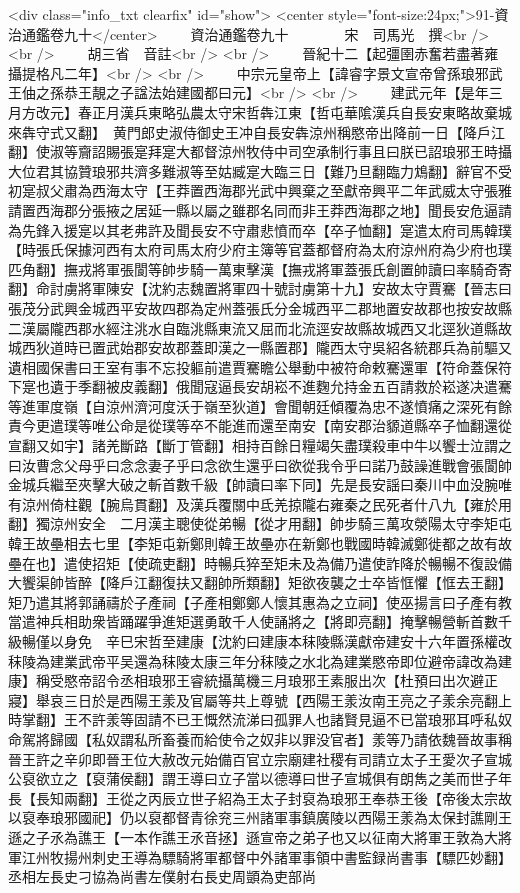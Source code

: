 <div class="info_txt clearfix" id="show">
<center style="font-size:24px;">91-資治通鑑卷九十</center>
  　　資治通鑑卷九十　　　　宋　司馬光　撰<br />
<br />
　　胡三省　音註<br />
<br />
　　晉紀十二【起彊圉赤奮若盡著雍攝提格凡二年】<br />
<br />
　　中宗元皇帝上【諱睿字景文宣帝曾孫琅邪武王伷之孫恭王靚之子諡法始建國都曰元】<br />
<br />
　　建武元年【是年三月方改元】春正月漢兵東略弘農太守宋哲犇江東【哲屯華隂漢兵自長安東略故棄城來犇守式又翻】　黄門郎史淑侍御史王冲自長安犇涼州稱愍帝出降前一日【降戶江翻】使淑等齎詔賜張寔拜寔大都督涼州牧侍中司空承制行事且曰朕已詔琅邪王時攝大位君其協贊琅邪共濟多難淑等至姑臧寔大臨三日【難乃旦翻臨力鴆翻】辭官不受初寔叔父肅為西海太守【王莽置西海郡光武中興棄之至獻帝興平二年武威太守張雅請置西海郡分張掖之居延一縣以屬之雖郡名同而非王莽西海郡之地】聞長安危逼請為先鋒入援寔以其老弗許及聞長安不守肅悲憤而卒【卒子恤翻】寔遣太府司馬韓璞【時張氏保據河西有太府司馬太府少府主簿等官蓋都督府為太府涼州府為少府也璞匹角翻】撫戎將軍張閬等帥步騎一萬東擊漢【撫戎將軍蓋張氏創置帥讀曰率騎奇寄翻】命討虜將軍陳安【沈約志魏置將軍四十號討虜第十九】安故太守賈騫【晉志曰張茂分武興金城西平安故四郡為定州蓋張氏分金城西平二郡地置安故郡也按安故縣二漢屬隴西郡水經注洮水自臨洮縣東流又屈而北流逕安故縣故城西又北逕狄道縣故城西狄道時已置武始郡安故郡蓋即漢之一縣置郡】隴西太守吳紹各統郡兵為前驅又遺相國保書曰王室有事不忘投軀前遣賈騫瞻公舉動中被符命敕騫還軍【符命蓋保符下寔也遺于季翻被皮義翻】俄聞寇逼長安胡崧不進麴允持金五百請救於崧遂决遣騫等進軍度嶺【自涼州濟河度沃于嶺至狄道】會聞朝廷傾覆為忠不遂憤痛之深死有餘責今更遣璞等唯公命是從璞等卒不能進而還至南安【南安郡治䝠道縣卒子恤翻還從宣翻又如宇】諸羌斷路【斷丁管翻】相持百餘日糧竭矢盡璞殺車中牛以饗士泣謂之曰汝曹念父母乎曰念念妻子乎曰念欲生還乎曰欲從我令乎曰諾乃鼓譟進戰會張閬帥金城兵繼至夾擊大破之斬首數千級【帥讀曰率下同】先是長安謡曰秦川中血没腕唯有涼州倚柱觀【腕烏貫翻】及漢兵覆關中氐羌掠隴右雍秦之民死者什八九【雍於用翻】獨涼州安全　二月漢主聰使從弟暢【從才用翻】帥步騎三萬攻滎陽太守李矩屯韓王故壘相去七里【李矩屯新鄭則韓王故壘亦在新鄭也戰國時韓滅鄭徙都之故有故壘在也】遣使招矩【使疏吏翻】時暢兵猝至矩未及為備乃遣使詐降於暢暢不復設備大饗渠帥皆醉【降戶江翻復扶又翻帥所類翻】矩欲夜襲之士卒皆恇懼【恇去王翻】矩乃遣其將郭誦禱於子產祠【子產相鄭鄭人懷其惠為之立祠】使巫揚言曰子產有教當遣神兵相助衆皆踊躍爭進矩選勇敢千人使誦將之【將即亮翻】掩擊暢營斬首數千級暢僅以身免　辛巳宋哲至建康【沈約曰建康本秣陵縣漢獻帝建安十六年置孫權改秣陵為建業武帝平吴還為秣陵太康三年分秣陵之水北為建業愍帝即位避帝諱改為建康】稱受愍帝詔令丞相琅邪王睿統攝萬機三月琅邪王素服出次【杜預曰出次避正寢】舉哀三日於是西陽王羕及官屬等共上尊號【西陽王羕汝南王亮之子羕余亮翻上時掌翻】王不許羕等固請不已王慨然流涕曰孤罪人也諸賢見逼不已當琅邪耳呼私奴命駕將歸國【私奴謂私所畜養而給使令之奴非以罪没官者】羕等乃請依魏晉故事稱晉王許之辛卯即晉王位大赦改元始備百官立宗廟建社稷有司請立太子王愛次子宣城公裒欲立之【裒蒲侯翻】謂王導曰立子當以德導曰世子宣城俱有朗雋之美而世子年長【長知兩翻】王從之丙辰立世子紹為王太子封裒為琅邪王奉恭王後【帝後太宗故以裒奉琅邪國祀】仍以裒都督青徐兖三州諸軍事鎮廣陵以西陽王羕為太保封譙剛王遜之子氶為譙王【一本作譙王氶音拯】遜宣帝之弟子也又以征南大將軍王敦為大將軍江州牧揚州刺史王導為驃騎將軍都督中外諸軍事領中書監録尚書事【驃匹妙翻】丞相左長史刁協為尚書左僕射右長史周顗為吏部尚